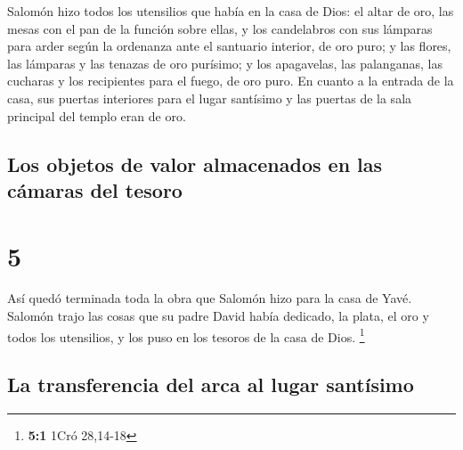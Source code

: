  Salomón hizo todos los utensilios que había en la casa
de Dios: el altar de oro, las mesas con el pan de la función sobre
ellas,  y los candelabros con sus lámparas para arder
según la ordenanza ante el santuario interior, de oro puro;
 y las flores, las lámparas y las tenazas de oro
purísimo;  y los apagavelas, las palanganas, las cucharas
y los recipientes para el fuego, de oro puro. En cuanto a la entrada de
la casa, sus puertas interiores para el lugar santísimo y las puertas de
la sala principal del templo eran de oro.

\hypertarget{los-objetos-de-valor-almacenados-en-las-cuxe1maras-del-tesoro}{%
\subsection{Los objetos de valor almacenados en las cámaras del
tesoro}\label{los-objetos-de-valor-almacenados-en-las-cuxe1maras-del-tesoro}}

\hypertarget{section-4}{%
\section{5}\label{section-4}}

 Así quedó terminada toda la obra que Salomón hizo para la
casa de Yavé. Salomón trajo las cosas que su padre David había dedicado,
la plata, el oro y todos los utensilios, y los puso en los tesoros de la
casa de Dios. \footnote{\textbf{5:1} 1Cró 28,14-18}

\hypertarget{la-transferencia-del-arca-al-lugar-santuxedsimo}{%
\subsection{La transferencia del arca al lugar
santísimo}\label{la-transferencia-del-arca-al-lugar-santuxedsimo}}

